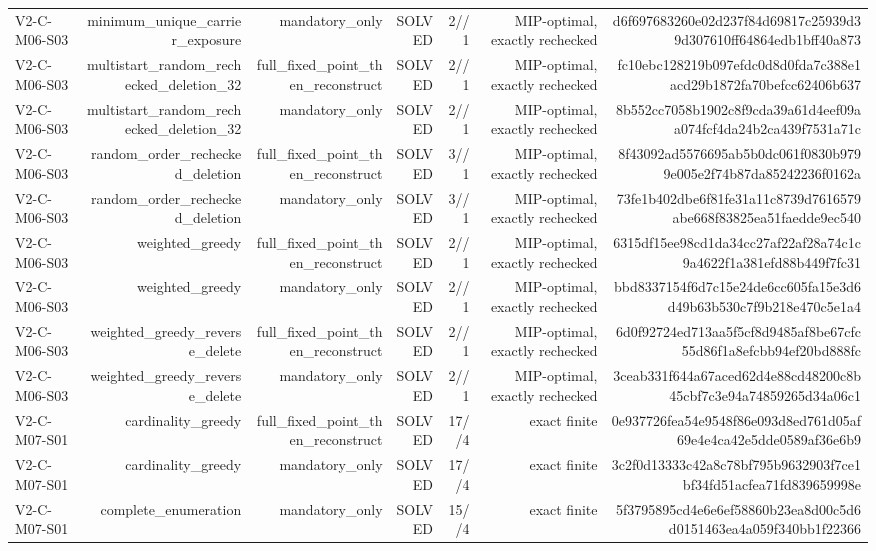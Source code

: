 {\begin{longtable}{lrrrrrr}
V2-C-M06-S03 & minimum\_unique\_carrier\_exposure & mandatory\_only & SOLVED & 2//1 & MIP-optimal, exactly rechecked & d6f697683260e02d237f84d69817c25939d39d307610ff64864edb1bff40a873 \\
V2-C-M06-S03 & multistart\_random\_rechecked\_deletion\_32 & full\_fixed\_point\_then\_reconstruct & SOLVED & 2//1 & MIP-optimal, exactly rechecked & fc10ebc128219b097efdc0d8d0fda7c388e1acd29b1872fa70befcc62406b637 \\
V2-C-M06-S03 & multistart\_random\_rechecked\_deletion\_32 & mandatory\_only & SOLVED & 2//1 & MIP-optimal, exactly rechecked & 8b552cc7058b1902c8f9cda39a61d4eef09aa074fcf4da24b2ca439f7531a71c \\
V2-C-M06-S03 & random\_order\_rechecked\_deletion & full\_fixed\_point\_then\_reconstruct & SOLVED & 3//1 & MIP-optimal, exactly rechecked & 8f43092ad5576695ab5b0dc061f0830b9799e005e2f74b87da85242236f0162a \\
V2-C-M06-S03 & random\_order\_rechecked\_deletion & mandatory\_only & SOLVED & 3//1 & MIP-optimal, exactly rechecked & 73fe1b402dbe6f81fe31a11c8739d7616579abe668f83825ea51faedde9ec540 \\
V2-C-M06-S03 & weighted\_greedy & full\_fixed\_point\_then\_reconstruct & SOLVED & 2//1 & MIP-optimal, exactly rechecked & 6315df15ee98cd1da34cc27af22af28a74c1c9a4622f1a381efd88b449f7fc31 \\
V2-C-M06-S03 & weighted\_greedy & mandatory\_only & SOLVED & 2//1 & MIP-optimal, exactly rechecked & bbd8337154f6d7c15e24de6cc605fa15e3d6d49b63b530c7f9b218e470c5e1a4 \\
V2-C-M06-S03 & weighted\_greedy\_reverse\_delete & full\_fixed\_point\_then\_reconstruct & SOLVED & 2//1 & MIP-optimal, exactly rechecked & 6d0f92724ed713aa5f5cf8d9485af8be67cfc55d86f1a8efcbb94ef20bd888fc \\
V2-C-M06-S03 & weighted\_greedy\_reverse\_delete & mandatory\_only & SOLVED & 2//1 & MIP-optimal, exactly rechecked & 3ceab331f644a67aced62d4e88cd48200c8b45cbf7c3e94a74859265d34a06c1 \\
V2-C-M07-S01 & cardinality\_greedy & full\_fixed\_point\_then\_reconstruct & SOLVED & 17//4 & exact finite & 0e937726fea54e9548f86e093d8ed761d05af69e4e4ca42e5dde0589af36e6b9 \\
V2-C-M07-S01 & cardinality\_greedy & mandatory\_only & SOLVED & 17//4 & exact finite & 3c2f0d13333c42a8c78bf795b9632903f7ce1bf34fd51acfea71fd839659998e \\
V2-C-M07-S01 & complete\_enumeration & mandatory\_only & SOLVED & 15//4 & exact finite & 5f3795895cd4e6e6ef58860b23ea8d00c5d6d0151463ea4a059f340bb1f22366 \\

\end{longtable}}

